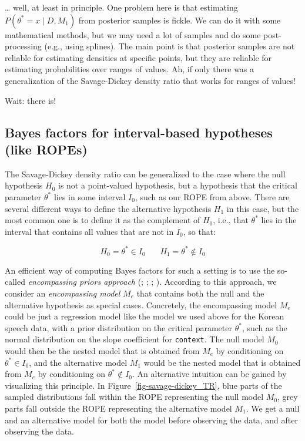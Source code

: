 \documentclass[
  doc,
  floatsintext,
  longtable,
  nolmodern,
  notxfonts,
  notimes,
  colorlinks=true,linkcolor=blue,citecolor=blue,urlcolor=blue]{apa7}
\begin{document}
\ldots{} well, at least in principle. One problem here is that
estimating \(P(\theta^*=x \mid D, M_1)\) from posterior samples is
fickle. We can do it with some mathematical methods, but we may need a
lot of samples and do some post-processing (e.g., using splines). The
main point is that posterior samples are not reliable for estimating
densities at specific points, but they are reliable for estimating
probabilities over ranges of values. Ah, if only there was a
generalization of the Savage-Dickey density ratio that works for ranges
of values!

Wait: there is!

\subsection{Bayes factors for interval-based hypotheses (like
ROPEs)}\label{bayes-factors-for-interval-based-hypotheses-like-ropes}

The Savage-Dickey density ratio can be generalized to the case where the
null hypothesis \(H_0\) is not a point-valued hypothesis, but a
hypothesis that the critical parameter \(\theta^*\) lies in some
interval \(I_0\), such as our ROPE from above. There are several
different ways to define the alternative hypothesis \(H_1\) in this
case, but the most common one is to define it as the complement of
\(H_0\), i.e., that \(\theta^*\) lies in the interval that contains all
values that are not in \(I_0\), so that:

\[
H_0 = \theta^* \in I_0 \ \ \ \ \ \ \ \  H_1 = \theta^* \not \in I_0
\]

An efficient way of computing Bayes factors for such a setting is to use
the so-called \emph{encompassing priors approach}
(;
; ;
). According to this approach, we consider an \emph{encompassing
model} \(M_e\) that contains both the null and the alternative
hypothesis as special cases. Concretely, the encompassing model \(M_e\)
could be just a regression model like the model we used above for the
Korean speech data, with a prior distribution on the critical parameter
\(\theta^*\), such as the normal distribution on the slope coefficient
for \texttt{context}. The null model \(M_0\) would then be the nested
model that is obtained from \(M_e\) by conditioning on
\(\theta^* \in I_0\), and the alternative model \(M_1\) would be the
nested model that is obtained from \(M_e\) by conditioning on
\(\theta^* \not \in I_0\). An alternative intuition can be gained by
visualizing this principle. In Figure~\ref{fig-savage-dickey_TR}, blue
parts of the sampled distributions fall within the ROPE representing the
null model \(M_0\), grey parts fall outside the ROPE representing the
alternative model \(M_1\). We get a null and an alternative model for
both the model before observing the data, and after observing the data.
\end{document}
